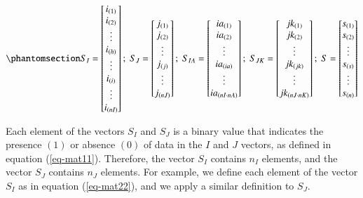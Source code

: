 \documentclass[
  authoryear,
  review,
  1p]{elsarticle}
\begin{document}
\begin{equation}\phantomsection\label{eq-mat21}{
S_{I} = \begin{bmatrix}
i_{(1)} \\
i_{(2)} \\
\vdots \\
i_{(h)} \\
\vdots \\
i_{(i)} \\
\vdots \\
i_{(nI)}
\end{bmatrix} ; \;
S_{J} = \begin{bmatrix}
j_{(1)} \\
j_{(2)} \\
\vdots \\
j_{(j)} \\
\vdots \\
j_{(nJ)}
\end{bmatrix} ; \;
S_{IA} = \begin{bmatrix}
ia_{(1)} \\
ia_{(2)} \\
\vdots \\
ia_{(ia)} \\
\vdots \\
ia_{(nI \cdot nA)} \\
\end{bmatrix} ; \;
S_{JK} = \begin{bmatrix}
jk_{(1)} \\
jk_{(2)} \\
\vdots \\
jk_{(jk)} \\
\vdots \\
jk_{(nJ \cdot nK)} \\
\end{bmatrix}; \;
S = \begin{bmatrix}
s_{(1)} \\
s_{(2)} \\
\vdots \\
s_{(s)} \\
\vdots \\
s_{(n)} \\
\end{bmatrix}
}\end{equation}

Each element of the vectors \(S_{I}\) and \(S_{J}\) is a binary value
that indicates the presence \((1)\) or absence \((0)\) of data in the
\(I\) and \(J\) vectors, as defined in equation (\ref{eq-mat11}).
Therefore, the vector \(S_{I}\) contains \(n_{I}\) elements, and the
vector \(S_{J}\) contains \(n_{J}\) elements. For example, we define
each element of the vector \(S_{I}\) as in equation (\ref{eq-mat22}),
and we apply a similar definition to \(S_{J}\).
\end{document}
